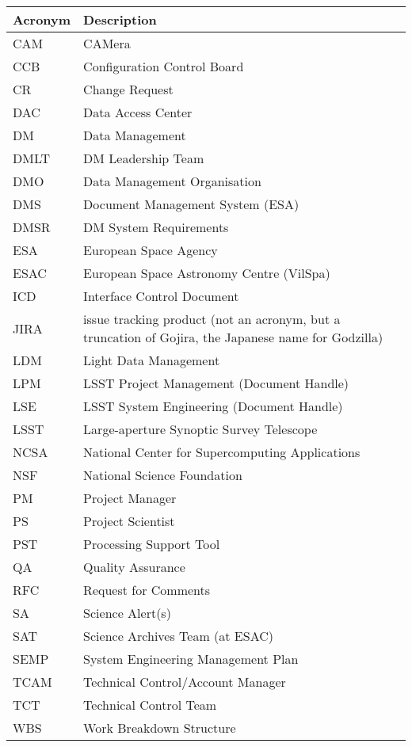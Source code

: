\addtocounter{table}{-1}
\begin{longtable}{|l|p{}|}\hline 
\textbf{Acronym} & \textbf{Description}  \\\hline
CAM&CAMera \\\hline
CCB&Configuration Control Board \\\hline
CR&Change Request \\\hline
DAC&Data Access Center \\\hline
DM&Data Management \\\hline
DMLT&DM Leadership Team \\\hline
DMO&Data Management Organisation \\\hline
DMS&Document Management System (ESA) \\\hline
DMSR&DM System Requirements \\\hline
ESA&European Space Agency \\\hline
ESAC&European Space Astronomy Centre (VilSpa) \\\hline
ICD&Interface Control Document \\\hline
JIRA&issue tracking product (not an acronym, but a truncation of Gojira, the Japanese name for Godzilla) \\\hline
LDM&Light Data Management \\\hline
LPM&LSST Project Management (Document Handle) \\\hline
LSE&LSST System Engineering (Document Handle) \\\hline
LSST&Large-aperture Synoptic Survey Telescope \\\hline
NCSA&National Center for Supercomputing Applications \\\hline
NSF&National Science Foundation \\\hline
PM&Project Manager \\\hline
PS&Project Scientist \\\hline
PST&Processing Support Tool \\\hline
QA&Quality Assurance \\\hline
RFC&Request for Comments \\\hline
SA&Science Alert(s) \\\hline
SAT&Science Archives Team (at ESAC) \\\hline
SEMP&System Engineering Management Plan \\\hline
TCAM&Technical Control/Account Manager \\\hline
TCT&Technical Control Team \\\hline
WBS&Work Breakdown Structure \\\hline
\end{longtable} 
